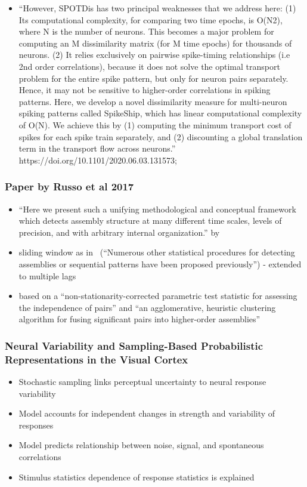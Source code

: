 \documentclass[brainsci, %
               review,submit,pdftex,moreauthors]{Definitions/mdpi}
\begin{document}
\begin{itemize}
 \item
  ``However, SPOTDis has two principal weaknesses that we address here: (1) Its computational complexity, for comparing two time epochs, is O(N2), where N is the number of neurons. This becomes a major problem for computing an M dissimilarity matrix (for M time epochs) for thousands of neurons. (2) It relies exclusively on pairwise spike-timing relationships (i.e 2nd order correlations), because it does not solve the optimal transport problem for the entire spike pattern, but only for neuron pairs separately. Hence, it may not be sensitive to higher-order correlations in spiking
  patterns.
  Here, we develop a novel dissimilarity measure for multi-neuron spiking patterns called SpikeShip, which has linear computational complexity of O(N). We achieve this by (1) computing the minimum transport cost of spikes for each spike train separately, and (2) discounting a global translation term in the transport flow across neurons.''
  https://doi.org/10.1101/2020.06.03.131573;
\end{itemize}

\subsubsection{Paper by Russo et al 2017~\citep{russo_cell_2017}}\label{paper-by-russo-et-al-2017-russo2017}
\begin{itemize}
 \item
  ``Here we present such a unifying methodological and conceptual framework which detects assembly structure at many different time scales, levels of precision, and with arbitrary internal organization.'' by~\citep{russo_cell_2017}
\item
  sliding window as in~\citep{grun_unitary_2002} (``Numerous other statistical procedures for detecting assemblies or sequential patterns have been proposed previously'') - extended to multiple lags~\citep{torre_synchronous_2016}
\item
  based on a ``non-stationarity-corrected parametric test statistic for assessing the independence of pairs'' and ``an agglomerative, heuristic clustering algorithm for fusing significant pairs into higher-order assemblies''
\end{itemize}

\subsubsection{Neural Variability and Sampling-Based Probabilistic Representations in the Visual Cortex~\citep{orban_neural_2016}}
\begin{itemize}
 \item
  Stochastic sampling links perceptual uncertainty to neural response variability
\item
  Model accounts for independent changes in strength and variability of responses
\item
  Model predicts relationship between noise, signal, and spontaneous correlations
\item
  Stimulus statistics dependence of response statistics is explained
\end{itemize}
\end{document}

